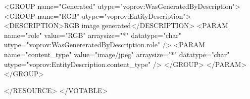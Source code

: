 \begin{verbnobox}[\scriptsize]
    <GROUP name="Generated" utype="voprov:WasGeneratedByDescription">
      <GROUP name="RGB" utype="voprov:EntityDescription">
        <DESCRIPTION>RGB image generated</DESCRIPTION>
        <PARAM name="role" value="RGB" arraysize="*" datatype="char" 
            utype="voprov:WasGenereratedByDescription.role" />
        <PARAM name="content_type" value="image/jpeg" arraysize="*" datatype="char" 
            utype="voprov:EntityDescription.content_type" />
      </GROUP>
      </PARAM>
    </GROUP>
    
  </RESOURCE>
</VOTABLE>

\end{verbnobox}

